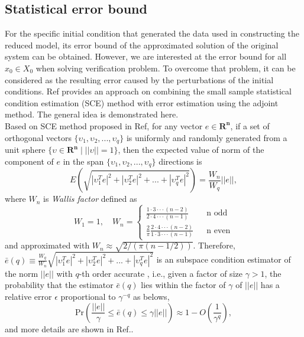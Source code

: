 \documentclass[runningheads,a4paper]{llncs}
\theoremstyle{definition}
\theoremstyle{plain}
\begin{document}
\subsection{Statistical error bound} 
For the specific initial condition that generated the data used in constructing the reduced model, its error bound of the approximated solution of the original system can be obtained. However, we are interested at the error bound for all $x_0 \in X_0$ when solving verification problem. To overcome that problem, it can be considered as the resulting error caused by the perturbations of the initial conditions. Ref\cite{Homescu05errorestimation} provides an approach on combining the small sample statistical condition estimation (SCE) method with error estimation using the adjoint method. The general idea is demonstrated here.\\

Based on SCE method proposed in Ref\cite{Kenney:1994:SSC:180322.180327}, for any vector $e \in \mathbf{R^n}$, if a set of orthogonal vectors $\{\upsilon_1, \upsilon_2,...,\upsilon_q\}$ is uniformly and randomly generated from a unit sphere $\{\upsilon \in \mathbf{R^n} \mid || \upsilon||=1\}$, then the expected value of norm of the component of $e$ in the span $\{\upsilon_1, \upsilon_2,...,\upsilon_q\}$ directions is\\
\[
E(\sqrt{|\upsilon^T_1 e|^2+|\upsilon^T_2 e|^2+...+|\upsilon^T_q e|^2})=\frac{W_n}{W_q}||e||,
\]  
where $W_n$ is \textit{Wallis factor} defined as\\
\[W_1=1,\quad W_n=\left\{
\begin{array}{lll}
\frac{1\cdot3\cdot\cdot\cdot(n-2)}{2\cdot4\cdot\cdot\cdot(n-1)}      &      & \mbox{n odd}\\
\frac{2}{\pi}\frac{2\cdot4\cdot\cdot\cdot(n-2)}{1\cdot3\cdot\cdot\cdot(n-1)}     &      & \mbox{n even}
\end{array} \right.\]
and approximated with $W_n \approx \sqrt{2/(\pi(n-1/2))}$. Therefore, $\bar{e}(q)\equiv\frac{W_q}{W_n}\sqrt{|\upsilon^T_1 e|^2+|\upsilon^T_2 e|^2+...+|\upsilon^T_q e|^2}$ is an subspace condition estimator of the norm $||e||$ with $q$-th order accurate \cite{Homescu05errorestimation}, i.e., given a factor of size $\gamma>1$, the probability that the estimator $\bar{e}(q)$ lies within the factor of $\gamma$ of $||e||$ has a relative error $\epsilon$ proportional to $\gamma^{-q}$ as belows,
\begin{equation}
\mathrm{Pr}\left( \frac{||e|| }{\gamma}\leq \bar{e}(q)\leq \gamma||e||\right)\approx 1-O(\frac{1}{\gamma^q}),
\end{equation}
and more details are shown in Ref.\cite{Kenney:1994:SSC:180322.180327}.\\
\end{document}

